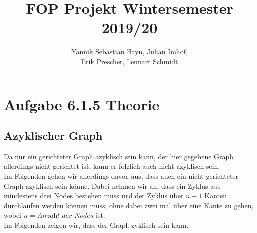 \documentclass{article}
\title{FOP Projekt Wintersemester 2019/20}
\author{Yannik Sebastian Hayn, Julian Imhof,\\ Erik Prescher, Lennart Schmidt}
\begin{document}
\maketitle
\section{Aufgabe 6.1.5 Theorie}
\subsection{Azyklischer Graph}
Da nur ein gerichteter Graph azyklisch sein kann, der hier gegebene Graph allerdings nicht gerichtet ist, kann er folglich auch nicht azyklisch sein.\\
 Im Folgenden gehen wir allerdings davon aus, dass auch ein nicht gerichteter Graph azyklisch sein k\"onne. Dabei nehmen wir an, dass ein Zyklus aus mindestens drei Nodes bestehen muss und der Zyklus \"uber $n - 1$ Kanten durchlaufen werden k\"onnen muss, ohne dabei zwei mal \"uber eine Kante zu gehen, wobei $n = \textit{Anzahl der Nodes}$ ist.\\
Im Folgenden zeigen wir, dass der Graph zyklisch sein kann.\\
\end{document}
